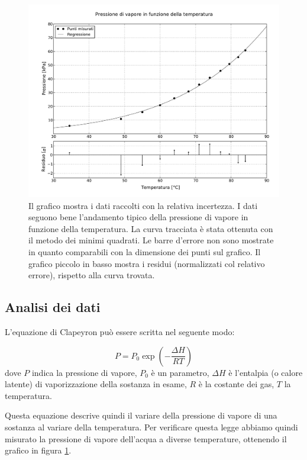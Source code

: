 \begin{figure}[h!]
    \includegraphics[width=16cm]{graph.pdf}
    \caption{Il grafico mostra i dati raccolti con la relativa incertezza. I dati seguono bene
    l'andamento tipico della pressione di vapore in funzione della temperatura.
    La curva tracciata è stata ottenuta con il metodo dei minimi quadrati. Le barre d'errore non sono
    mostrate in quanto comparabili con la dimensione dei punti sul grafico. Il grafico piccolo in basso
    mostra i residui (normalizzati col relativo errore), rispetto alla curva trovata.}
    \label{fig:graph}
\end{figure}


\subsection{Analisi dei dati}

L'equazione di Clapeyron può essere scritta nel seguente modo:

\begin{equation}
    P = P_0 \exp \left( - \frac{\Delta H}{RT} \right)
    \label{eq:clap}
\end{equation}
%
dove $P$ indica la pressione di vapore, $P_0$ è un parametro, $\Delta H$ è l'entalpia
(o calore latente) di vaporizzazione della sostanza in esame, $R$ è la costante dei gas, $T$ la temperatura.

Questa equazione descrive quindi il variare della pressione di vapore di una sostanza al variare della temperatura.
Per verificare questa legge abbiamo quindi misurato la pressione di vapore dell'acqua a diverse temperature,
ottenendo il grafico in figura \ref{fig:graph}. 

